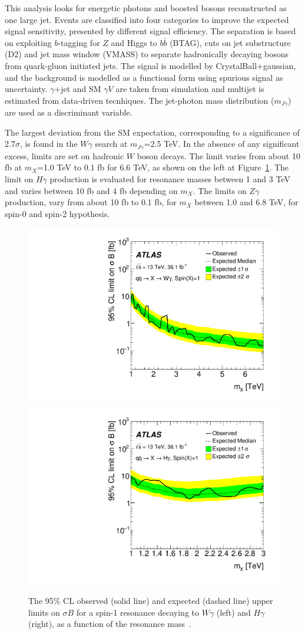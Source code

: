\documentclass{PoS}
\begin{document}
This analysis looks for energetic photons and boosted bosons reconstructed as one large jet.
Events are classified into four categories to improve the expected signal sensitivity, presented by different signal efficiency. 
The separation is based on exploiting $b$-tagging for $Z$ and Higgs to $b\bar{b}$ (BTAG), cuts on jet substructure (D2) and jet mass window (VMASS) to separate hadronically decaying bosons from quark-gluon initiated jets.
The signal is modelled by CrystalBall+gaussian, and the background is modelled as a functional form using spurious signal as uncertainty. $\gamma$+jet and SM $\gamma V$ are taken from simulation and multijet is estimated from data-driven tecnhiques.
The jet-photon mass distribution ($m_{J \gamma}$) are used as a discriminant variable. %

The largest deviation from the SM expectation, corresponding to a significance of 2.7$\sigma$, is found in the $W\gamma$ search at $m_{J \gamma}$=2.5 TeV.
In the absence of any significant excess, limits are set on hadronic $W$ boson decays.
The limit varies from about 10 fb at $m_X$=1.0 TeV to 0.1 fb for 6.6 TeV, as shown on the left at Figure~\ref{fig:Wg_lim}. 
The limit on $H\gamma$ production is evaluated for resonance masses between 1 and 3 TeV and varies between 10 fb and 4 fb depending on $m_X$.
The limits on $Z\gamma$ production, vary from about 10 fb to 0.1 fb, for $m_X$ between 1.0 and 6.8 TeV, for spin-0 and spin-2 hypothesis. %
\vspace*{-4mm}
 \begin{figure}
 \hspace{5mm}
     \includegraphics[width=.4\textwidth]{figures/lim_Wg_qqA1}
 \hspace{10mm}
      \includegraphics[width=.4\textwidth]{figures/lim_Hg_qqA1}
      \vspace*{-2mm}
     \caption{The 95\% CL observed (solid line) and expected (dashed line) upper limits on $\sigma B$ for a spin-1 resonance decaying to $W\gamma$ (left) and $H\gamma$ (right), as a function of the resonance mass~\cite{EXOT-2016-30}.}
     \label{fig:Wg_lim}
     \end{figure}
\end{document}
